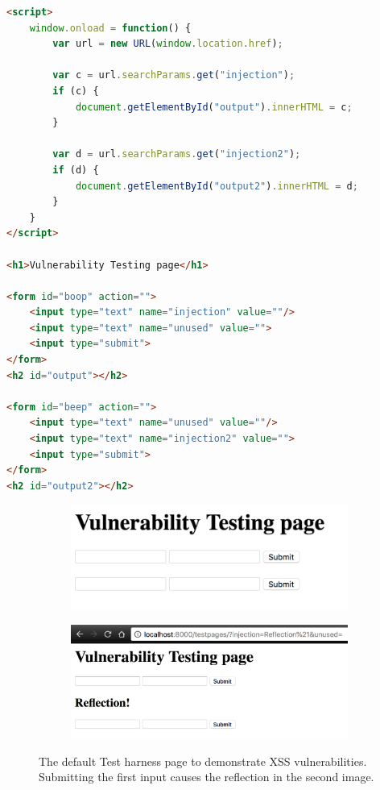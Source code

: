 \begin{lstlisting}[label={lst:test_harness}, language={HTML}, caption={The HTML contents of the Test Harness for this example. Two of the inputs in the page are reflected onto the page when they are submitted as query parameters (i.e. seen in the page URL)}]
<script>
	window.onload = function() {
		var url = new URL(window.location.href);
		
		var c = url.searchParams.get("injection");
		if (c) {
			document.getElementById("output").innerHTML = c;
		}
		
		var d = url.searchParams.get("injection2");
		if (d) {
			document.getElementById("output2").innerHTML = d;
		}
	}
</script>

<h1>Vulnerability Testing page</h1>

<form id="boop" action="">
	<input type="text" name="injection" value=""/>
	<input type="text" name="unused" value="">
	<input type="submit">
</form>
<h2 id="output"></h2>

<form id="beep" action="">
	<input type="text" name="unused" value=""/>
	<input type="text" name="injection2" value="">
	<input type="submit">
</form>
<h2 id="output2"></h2>
\end{lstlisting}



\begin{figure}[h]
	\centering
	\begin{subfigure}{.45\textwidth}
		\centering
		\includegraphics[width=.8\linewidth]{images/test_harness_recommendations.png}
		\label{fig:test_harness_original}
	\end{subfigure}%
	\begin{subfigure}{.6\textwidth}
		\centering
		\includegraphics[width=.8\linewidth]{images/test_harness_reflection_1.png}
		\label{fig:test_harness_reflection_1}
	\end{subfigure}
	\caption{The default Test harness page to demonstrate XSS vulnerabilities. Submitting the first input causes the reflection in the second image.}
	\label{fig:test_harness_default}
\end{figure} 

